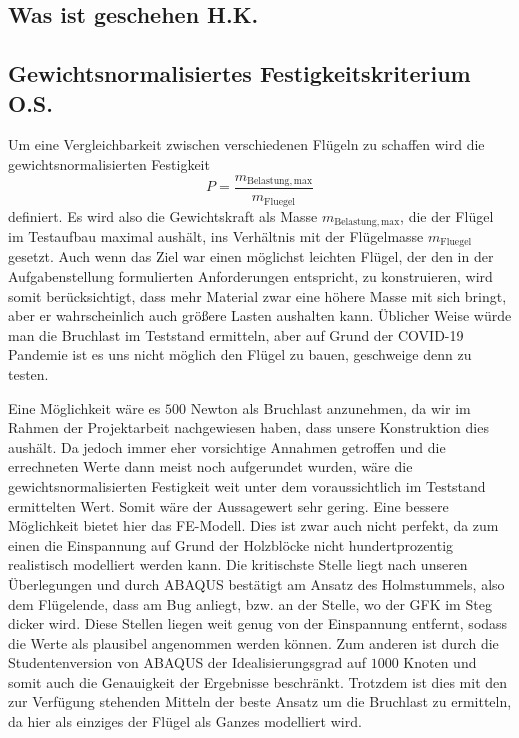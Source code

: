 \subsection{Was ist geschehen H.K.}
\subsection{Gewichtsnormalisiertes Festigkeitskriterium O.S.}
Um eine Vergleichbarkeit zwischen verschiedenen Flügeln zu schaffen wird die gewichtsnormalisierten Festigkeit
\begin{equation}
	P=\frac{m_{\mathrm{Belastung,max}}}{m_{\mathrm{Fluegel}}}
\end{equation}
definiert. Es wird also die Gewichtskraft als Masse $m_{\mathrm{Belastung,max}}$, die der Flügel im Testaufbau maximal aushält, ins Verhältnis mit der Flügelmasse $m_{\mathrm{Fluegel}}$ gesetzt. Auch wenn das Ziel war einen möglichst leichten Flügel, der den in der Aufgabenstellung formulierten Anforderungen entspricht, zu konstruieren, wird somit berücksichtigt, dass mehr Material zwar eine höhere Masse mit sich bringt, aber er wahrscheinlich auch größere Lasten aushalten kann. Üblicher Weise würde man die Bruchlast im Teststand ermitteln, aber auf Grund der COVID-19 Pandemie ist es uns nicht möglich den Flügel zu bauen, geschweige denn zu testen.
	
Eine Möglichkeit wäre es $500$ Newton als Bruchlast anzunehmen, da wir im Rahmen der Projektarbeit nachgewiesen haben, dass unsere Konstruktion dies aushält. Da jedoch immer eher vorsichtige Annahmen getroffen und die errechneten Werte dann meist noch aufgerundet wurden, wäre die gewichtsnormalisierten Festigkeit weit unter dem voraussichtlich im Teststand ermittelten Wert. Somit wäre der Aussagewert sehr gering.
Eine bessere Möglichkeit bietet hier das FE-Modell. Dies ist zwar auch nicht perfekt, da zum einen die Einspannung auf Grund der Holzblöcke nicht hundertprozentig realistisch modelliert werden kann. Die kritischste Stelle liegt nach unseren Überlegungen und durch ABAQUS bestätigt am Ansatz des Holmstummels, also dem Flügelende, dass am Bug anliegt, bzw. an der Stelle, wo der GFK im Steg dicker wird. Diese Stellen liegen weit genug von der Einspannung entfernt, sodass die Werte als plausibel angenommen werden können. Zum anderen ist durch die Studentenversion von ABAQUS der Idealisierungsgrad auf $1000$ Knoten und somit auch die Genauigkeit der Ergebnisse beschränkt. Trotzdem ist dies mit den zur Verfügung stehenden Mitteln der beste Ansatz um die Bruchlast zu ermitteln, da hier als einziges der Flügel als Ganzes modelliert wird.

